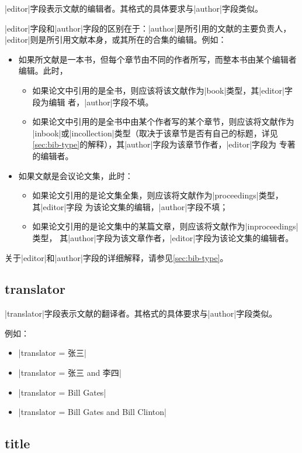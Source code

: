 |editor|字段表示文献的编辑者。其格式的具体要求与|author|字段类似。

|editor|字段和|author|字段的区别在于：|author|是所引用的文献的主要负责人，
|editor|则是所引用文献本身，或其所在的合集的编辑。例如：
\begin{itemize}
\item 如果所文献是一本书，但每个章节由不同的作者所写，而整本书由某个编辑者编辑。此时，
  \begin{itemize}
  \item 如果论文中引用的是全书，则应该将该文献作为|book|类型，其|editor|字段为编辑
    者，|author|字段不填。
  \item 如果论文中引用的是全书中由某个作者写的某个章节，则应该将文献作为
    |inbook|或|incollection|类型（取决于该章节是否有自己的标题，详见
    \ref{sec:bib-type}的解释），其|author|字段为该章节作者，|editor|字段为
    专著的编辑者。
  \end{itemize}
\item 如果文献是会议论文集，此时：
  \begin{itemize}
  \item 如果论文引用的是论文集全集，则应该将文献作为|proceedings|类型，其|editor|字段
    为该论文集的编辑，|author|字段不填；
  \item 如果论文引用的是论文集中的某篇文章，则应该将文献作为|inproceedings|类型，
    其|author|字段为该文章作者，|editor|字段为该论文集的编辑者。
  \end{itemize}
\end{itemize}

关于|editor|和|author|字段的详细解释，请参见\ref{sec:bib-type}。

\subsection{translator}\label{subsec:translator}

|translator|字段表示文献的翻译者。其格式的具体要求与|author|字段类似。

例如：
\begin{itemize}
\item |translator = {张三}|
\item |translator = {张三 and 李四}|
\item |translator = {Bill Gates}|
\item |translator = {Bill Gates and Bill Clinton}|
\end{itemize}

\subsection{title}\label{subsec:bibfield-title}

